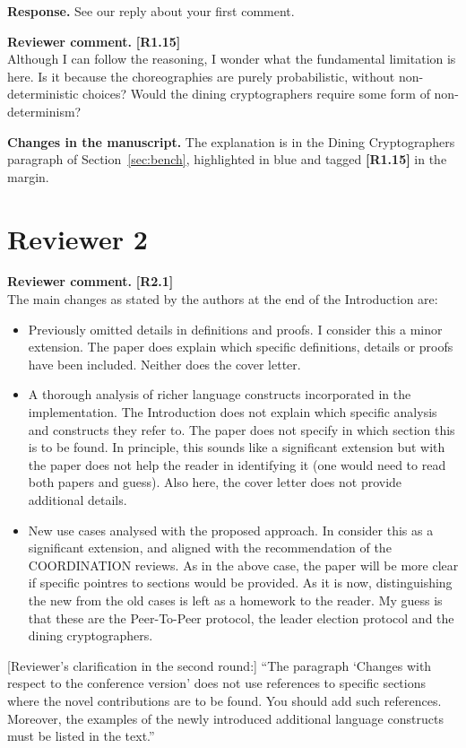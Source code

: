 \documentclass[11pt]{article}
\newcommand{\revcomment}[1]{%
  \begin{reviewercomment}
  \textbf{Reviewer comment.} #1
  \end{reviewercomment}
}
\newcommand{\revresponse}[2][]{%
  \par\noindent\textbf{Response.} #1 #2
}
\newcommand{\revchanges}[2][]{%
  \par\noindent\textbf{Changes in the manuscript.} #1
  #2\par\bigskip
}
\begin{document}
\revresponse{ See our reply about your first comment.  }

\revcomment{\textbf{[R1.15]}\\
Although I can follow the reasoning, I wonder what the fundamental
limitation is here. Is it because the choreographies are purely
probabilistic, without non-deterministic choices? Would the dining
cryptographers require some form of non-determinism?
}

\revchanges{ The explanation is in the Dining Cryptographers paragraph
  of Section~\ref{sec:bench}, highlighted in blue and tagged
  \textbf{[R1.15]} in the margin.}

\newpage

\section*{Reviewer 2}


\revcomment{\textbf{[R2.1]}\\
The main changes as stated by the authors at the end of the
Introduction are:
\begin{itemize}
\item Previously omitted details in definitions and proofs. I consider
  this a minor extension. The paper does explain which specific
  definitions, details or proofs have been included. Neither does the
  cover letter.
\item A thorough analysis of richer language constructs incorporated
  in the implementation. The Introduction does not explain which
  specific analysis and constructs they refer to. The paper does not
  specify in which section this is to be found. In principle, this
  sounds like a significant extension but with the paper does not help
  the reader in identifying it (one would need to read both papers and
  guess). Also here, the cover letter does not provide additional
  details.
\item New use cases analysed with the proposed approach. In consider
  this as a significant extension, and aligned with the recommendation
  of the COORDINATION reviews. As in the above case, the paper will be
  more clear if specific pointres to sections would be provided. As it
  is now, distinguishing the new from the old cases is left as a
  homework to the reader. My guess is that these are the
  Peer-To-Peer protocol, the leader election protocol and the dining
  cryptographers.
\end{itemize}

[Reviewer's clarification in the second round:]
``The paragraph `Changes with respect to the conference version' does
not use references to specific sections where the novel contributions
are to be found. You should add such references. Moreover, the
examples of the newly introduced additional language constructs must
be listed in the text.''
}
\end{document}

